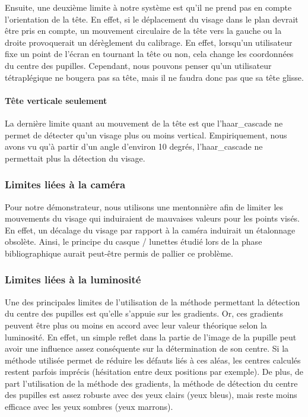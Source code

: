 Ensuite, une deuxième limite à notre système est qu’il ne prend pas en compte l’orientation de la tête. En effet, si le déplacement du visage dans le plan devrait être pris en compte, un mouvement circulaire de la tête vers la gauche ou la droite provoquerait un dérèglement du calibrage. En effet, lorsqu’un utilisateur fixe un point de l’écran en tournant la tête ou non, cela change les coordonnées du centre des pupilles. Cependant, nous pouvons penser qu’un utilisateur tétraplégique ne bougera pas sa tête, mais il ne faudra donc pas que sa tête glisse.

\paragraph{Tête verticale seulement}
La dernière limite quant  au mouvement de la tête est que l’haar\_cascade ne permet de détecter qu’un visage plus ou moins vertical. Empiriquement, nous avons vu qu’à partir d’un angle d’environ 10 degrés, l’haar\_cascade ne permettait plus la détection du visage. 

\subsubsection{Limites liées à la caméra}

Pour notre démonstrateur, nous utilisons une mentonnière afin de limiter les mouvements du visage qui induiraient de mauvaises valeurs pour les points visés. En effet, un décalage du visage par rapport à la caméra induirait un étalonnage obsolète. Ainsi, le principe du casque / lunettes étudié lors de la phase bibliographique aurait peut-être permis de pallier ce problème.

\subsubsection{Limites liées à la luminosité}

Une des principales limites de l’utilisation de la méthode permettant la détection du centre des pupilles est qu’elle s’appuie sur les gradients. Or, ces gradients peuvent être plus ou moins en accord avec leur valeur théorique selon la luminosité. En effet, un simple reflet dans la partie de l’image de la pupille peut avoir une influence assez conséquente sur la détermination de son centre. Si la méthode utilisée permet de réduire les défauts liés à ces aléas, les centres calculés restent parfois imprécis (hésitation entre deux positions par exemple). De plus, de part l’utilisation de la méthode des gradients, la méthode de détection du centre des pupilles est assez robuste avec des yeux clairs (yeux bleus), mais reste moins efficace avec les yeux sombres (yeux marrons).

